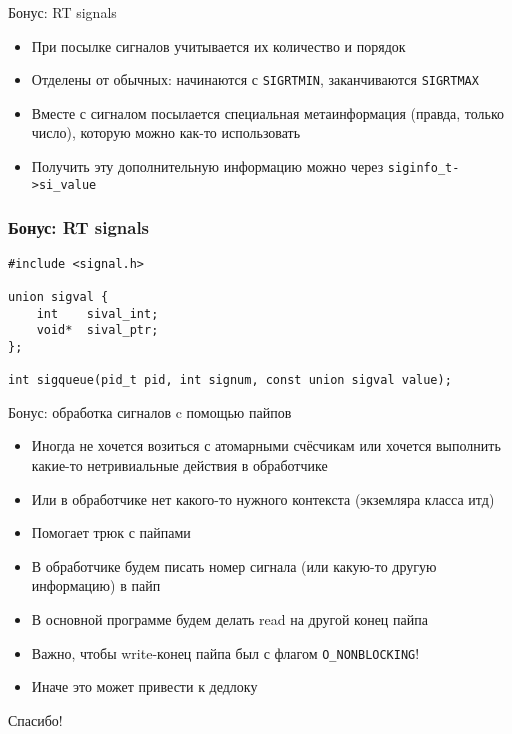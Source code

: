 \documentclass[10pt,pdf,hyperref={unicode}]{beamer}
\begin{document}
\begin{frame}{Бонус: RT signals}
\begin{itemize}
    \item При посылке сигналов учитывается их количество и порядок
    \item Отделены от обычных: начинаются с \texttt{SIGRTMIN}, заканчиваются \texttt{SIGRTMAX}
    \item Вместе с сигналом посылается специальная метаинформация (правда, только число), которую можно как-то использовать
    \item Получить эту дополнительную информацию можно через \texttt{siginfo_t->si_value}
\end{itemize}
\end{frame}

\begin{frame}[fragile]
\frametitle{Бонус: RT signals}
\begin{center}
\begin{minipage}{0.95\textwidth}
\begin{verbatim}
#include <signal.h>

union sigval {
    int    sival_int;
    void*  sival_ptr;
};

int sigqueue(pid_t pid, int signum, const union sigval value);
\end{verbatim}
\end{minipage}
\end{center}
\end{frame}

\begin{frame}{Бонус: обработка сигналов c помощью пайпов}
\begin{itemize}
    \item Иногда не хочется возиться с атомарными счёсчикам или хочется выполнить какие-то нетривиальные действия в обработчике
    \item Или в обработчике нет какого-то нужного контекста (экземляра класса итд)
    \item Помогает трюк с пайпами
    \item В обработчике будем писать номер сигнала (или какую-то другую информацию) в пайп
    \item В основной программе будем делать read на другой конец пайпа
    \item Важно, чтобы write-конец пайпа был с флагом \texttt{O_NONBLOCKING}!
    \item Иначе это может привести к дедлоку
\end{itemize}
\end{frame}

\begin{frame}
\center\Huge{Спасибо!}
\end{frame}
\end{document}
